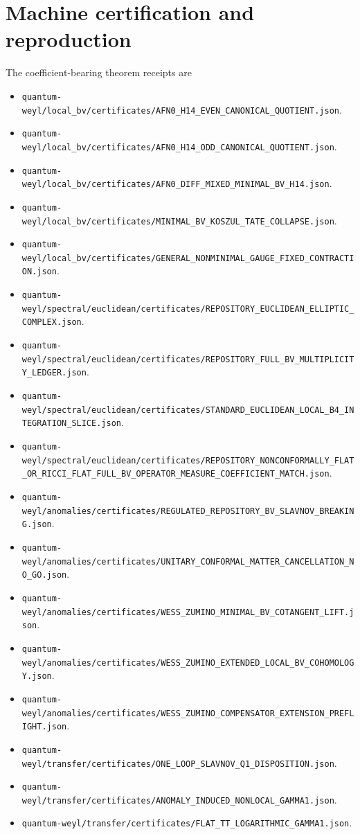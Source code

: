 \documentclass[11pt]{article}
\theoremstyle{definition}
\theoremstyle{remark}
\newcommand{\cert}[1]{\nolinkurl{#1}}
\begin{document}
\section{Machine certification and reproduction}

The coefficient-bearing theorem receipts are
\begin{itemize}
\item \cert{quantum-weyl/local_bv/certificates/AFN0_H14_EVEN_CANONICAL_QUOTIENT.json}.
\item \cert{quantum-weyl/local_bv/certificates/AFN0_H14_ODD_CANONICAL_QUOTIENT.json}.
\item \cert{quantum-weyl/local_bv/certificates/AFN0_DIFF_MIXED_MINIMAL_BV_H14.json}.
\item \cert{quantum-weyl/local_bv/certificates/MINIMAL_BV_KOSZUL_TATE_COLLAPSE.json}.
\item \cert{quantum-weyl/local_bv/certificates/GENERAL_NONMINIMAL_GAUGE_FIXED_CONTRACTION.json}.
\item \cert{quantum-weyl/spectral/euclidean/certificates/REPOSITORY_EUCLIDEAN_ELLIPTIC_COMPLEX.json}.
\item \cert{quantum-weyl/spectral/euclidean/certificates/REPOSITORY_FULL_BV_MULTIPLICITY_LEDGER.json}.
\item \cert{quantum-weyl/spectral/euclidean/certificates/STANDARD_EUCLIDEAN_LOCAL_B4_INTEGRATION_SLICE.json}.
\item \cert{quantum-weyl/spectral/euclidean/certificates/REPOSITORY_NONCONFORMALLY_FLAT_OR_RICCI_FLAT_FULL_BV_OPERATOR_MEASURE_COEFFICIENT_MATCH.json}.
\item \cert{quantum-weyl/anomalies/certificates/REGULATED_REPOSITORY_BV_SLAVNOV_BREAKING.json}.
\item \cert{quantum-weyl/anomalies/certificates/UNITARY_CONFORMAL_MATTER_CANCELLATION_NO_GO.json}.
\item \cert{quantum-weyl/anomalies/certificates/WESS_ZUMINO_MINIMAL_BV_COTANGENT_LIFT.json}.
\item \cert{quantum-weyl/anomalies/certificates/WESS_ZUMINO_EXTENDED_LOCAL_BV_COHOMOLOGY.json}.
\item \cert{quantum-weyl/anomalies/certificates/WESS_ZUMINO_COMPENSATOR_EXTENSION_PREFLIGHT.json}.
\item \cert{quantum-weyl/transfer/certificates/ONE_LOOP_SLAVNOV_Q1_DISPOSITION.json}.
\item \cert{quantum-weyl/transfer/certificates/ANOMALY_INDUCED_NONLOCAL_GAMMA1.json}.
\item \cert{quantum-weyl/transfer/certificates/FLAT_TT_LOGARITHMIC_GAMMA1.json}.

\end{itemize}
\end{document}
